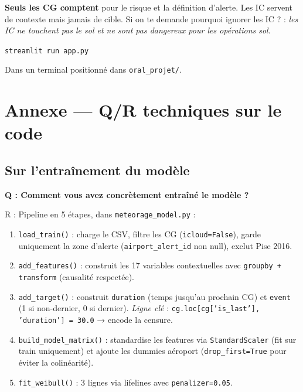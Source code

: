 \documentclass[11pt,a4paper]{article}
\begin{document}
\begin{tcolorbox}[colback=blue!4,colframe=blue!50!black,title=\textbf{Convention essentielle}]
\textbf{Seuls les CG comptent} pour le risque et la définition d'alerte. Les IC servent
de contexte mais jamais de cible. Si on te demande \og pourquoi ignorer les IC ? \fg{} :
\emph{les IC ne touchent pas le sol et ne sont pas dangereux pour les opérations sol}.
\end{tcolorbox}

\begin{tcolorbox}[colback=green!4,colframe=green!50!black,title=\textbf{Pour la démo (binôme)}]
\texttt{streamlit run app.py}

\noindent Dans un terminal positionné dans \texttt{oral\_projet/}.
\end{tcolorbox}

\section{Annexe — Q/R techniques sur le code}

\subsection*{Sur l'entraînement du modèle}

\begin{piege}
\textbf{Q : Comment vous avez concrètement entraîné le modèle ?}

R : Pipeline en 5 étapes, dans \texttt{meteorage\_model.py} :
\begin{enumerate}[topsep=2pt]
    \item \texttt{load\_train()} : charge le CSV, filtre les CG (\texttt{icloud=False}),
    garde uniquement la zone d'alerte (\texttt{airport\_alert\_id} non null), exclut
    Pise 2016.
    \item \texttt{add\_features()} : construit les 17 variables contextuelles avec
    \texttt{groupby + transform} (causalité respectée).
    \item \texttt{add\_target()} : construit \texttt{duration} (temps jusqu'au prochain CG)
    et \texttt{event} (1 si non-dernier, 0 si dernier). \emph{Ligne clé} :
    \texttt{cg.loc[cg['is\_last'], 'duration'] = 30.0} → encode la censure.
    \item \texttt{build\_model\_matrix()} : standardise les features via
    \texttt{StandardScaler} (fit sur train uniquement) et ajoute les dummies aéroport
    (\texttt{drop\_first=True} pour éviter la colinéarité).
    \item \texttt{fit\_weibull()} : 3 lignes via lifelines avec \texttt{penalizer=0.05}.
\end{enumerate}
\end{piege}
\end{document}
